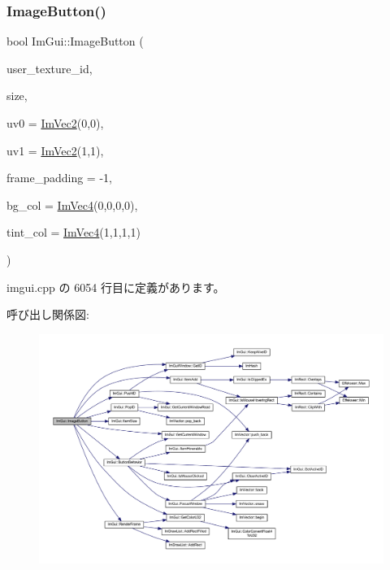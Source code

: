 \subsubsection{\texorpdfstring{Image\+Button()}{ImageButton()}}
{\footnotesize\ttfamily bool Im\+Gui\+::\+Image\+Button (\begin{DoxyParamCaption}\item[{\mbox{\hyperlink{imgui_8h_a364f4447ecbc4ca176145ccff9db6286}{Im\+Texture\+ID}}}]{user\+\_\+texture\+\_\+id,  }\item[{const \mbox{\hyperlink{struct_im_vec2}{Im\+Vec2}} \&}]{size,  }\item[{const \mbox{\hyperlink{struct_im_vec2}{Im\+Vec2}} \&}]{uv0 = {\ttfamily \mbox{\hyperlink{struct_im_vec2}{Im\+Vec2}}(0,0)},  }\item[{const \mbox{\hyperlink{struct_im_vec2}{Im\+Vec2}} \&}]{uv1 = {\ttfamily \mbox{\hyperlink{struct_im_vec2}{Im\+Vec2}}(1,1)},  }\item[{int}]{frame\+\_\+padding = {\ttfamily -\/1},  }\item[{const \mbox{\hyperlink{struct_im_vec4}{Im\+Vec4}} \&}]{bg\+\_\+col = {\ttfamily \mbox{\hyperlink{struct_im_vec4}{Im\+Vec4}}(0,0,0,0)},  }\item[{const \mbox{\hyperlink{struct_im_vec4}{Im\+Vec4}} \&}]{tint\+\_\+col = {\ttfamily \mbox{\hyperlink{struct_im_vec4}{Im\+Vec4}}(1,1,1,1)} }\end{DoxyParamCaption})}



 imgui.\+cpp の 6054 行目に定義があります。

呼び出し関係図\+:\nopagebreak
\begin{figure}[H]
\begin{center}
\leavevmode
\includegraphics[width=350pt]{namespace_im_gui_ac79ef64e8b9e1db73d8237f6a999da14_cgraph}
\end{center}
\end{figure}
\mbox{\label{namespace_im_gui_a6c7b9f2d60951462eeebad80154a8926}} 
